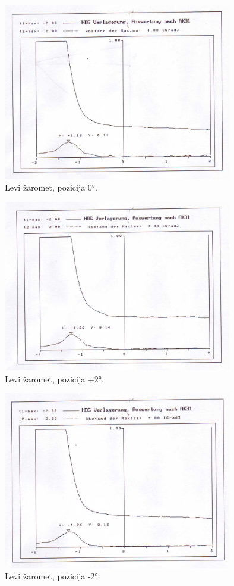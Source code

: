 \documentclass[oneside, a4paper, 12pt]{book}
\begin{document}
\begin{figure}
\begin{center}
\includegraphics[width=10cm]{slike/fotometer-levi-0.jpg}
\end{center}
\caption{Levi žaromet, pozicija 0°.}
\label{pic:opt-g}
\end{figure}

\begin{figure}
\begin{center}
\includegraphics[width=10cm]{slike/fotometer-levi-+2.jpg}
\end{center}
\caption{Levi žaromet, pozicija +2°.}
\label{pic:opt-g}
\end{figure}

\begin{figure}
\begin{center}
\includegraphics[width=10cm]{slike/fotometer-levi--2.jpg}
\end{center}
\caption{Levi žaromet, pozicija -2°.}
\label{pic:opt-g}
\end{figure}
\end{document}
